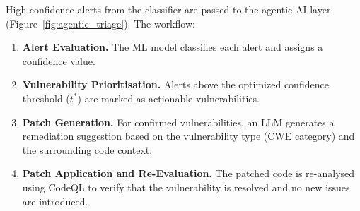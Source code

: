 High-confidence alerts from the classifier are passed to the agentic AI layer
(Figure~\ref{fig:agentic_triage}). The workflow:

\begin{enumerate}
  \item \textbf{Alert Evaluation.} The ML model classifies each alert and assigns a
        confidence value.
  \item \textbf{Vulnerability Prioritisation.} Alerts above the optimized confidence
        threshold ($t^*$) are marked as actionable vulnerabilities.
  \item \textbf{Patch Generation.} For confirmed vulnerabilities, an LLM generates a
        remediation suggestion based on the vulnerability type (CWE category) and the
        surrounding code context.
  \item \textbf{Patch Application and Re-Evaluation.} The patched code is re-analysed
        using CodeQL to verify that the vulnerability is resolved and no new issues are introduced.
\end{enumerate}